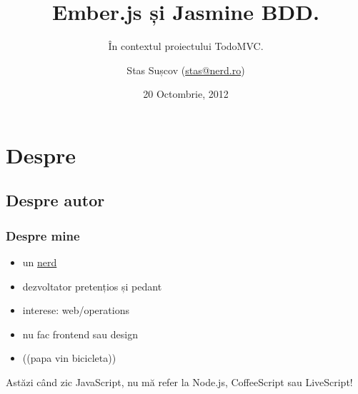 \documentclass[compress]{beamer}
\title{Ember.js și Jasmine BDD.}
\subtitle{În contextul proiectului TodoMVC.}
\author{Stas Sușcov (\href{mailto:stas@nerd.ro}{stas@nerd.ro})}
\date{20 Octombrie, 2012}
\institute{GeekMeet \#12, Cluj-Napoca, Transilvania}
\begin{document}
\maketitle


\section{Despre}

\subsection{Despre autor}

\begin{frame}
\frametitle{Despre mine}

\begin{itemize}[<+->]
  \item un \href{http://stas.nerd.ro}{nerd}
  \item dezvoltator pretențios și pedant
  \item interese: web/operations
  \item nu fac frontend sau design
  \item (\Heart (papa vin bicicleta))
\end{itemize}
\end{frame}

\begin{frame}
  \begin{center}
  \huge Astăzi când zic JavaScript, nu mă refer la Node.js, CoffeeScript sau LiveScript!
  \end{center}
\end{frame}
\end{document}
